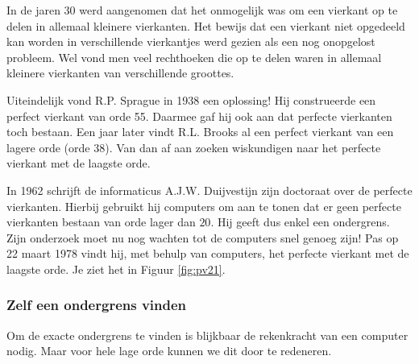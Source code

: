 In de jaren 30 werd aangenomen dat het onmogelijk was om een vierkant op te delen in allemaal kleinere vierkanten. Het bewijs dat een vierkant niet opgedeeld kan worden in verschillende vierkantjes werd gezien als een nog onopgelost probleem. Wel vond men veel rechthoeken die op te delen waren in allemaal kleinere vierkanten van verschillende groottes.

Uiteindelijk vond R.P. Sprague in 1938 een oplossing! Hij construeerde een perfect vierkant van orde 55. Daarmee gaf hij ook aan dat perfecte vierkanten toch bestaan. Een jaar later vindt R.L. Brooks al een perfect vierkant van een lagere orde (orde 38). Van dan af aan zoeken wiskundigen naar het perfecte vierkant met de laagste orde.

In 1962 schrijft de informaticus A.J.W. Duijvestijn zijn doctoraat over de perfecte vierkanten. Hierbij gebruikt hij computers om aan te tonen dat er geen perfecte vierkanten bestaan van orde lager dan $20$. Hij geeft dus enkel een ondergrens. Zijn onderzoek moet nu nog wachten tot de computers snel genoeg zijn! Pas op 22 maart 1978 vindt hij, met behulp van computers, het perfecte vierkant met de laagste orde. Je ziet het in Figuur \ref{fig:pv21}.

\subsubsection{Zelf een ondergrens vinden}

Om de exacte ondergrens te vinden is blijkbaar de rekenkracht van een computer nodig. Maar voor hele lage orde kunnen we dit door te redeneren.





